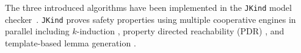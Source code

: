%
%
%
The three introduced algorithms have been implemented in the \texttt{JKind} model checker~\cite{jkind,NFM2012:CoGaMiWhLaLu,Spear}. %
\texttt{JKind} proves safety properties using multiple cooperative engines in parallel including $k$-induction \cite{SheeranSS00}, property directed reachability (PDR) \cite{Een2011:PDR}, and template-based lemma generation \cite{Kahsai2011}. %

